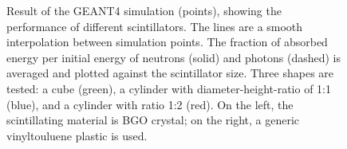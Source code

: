 \begin{figure}
	\centering
	\resizebox{\textwidth}{!}{}
	\caption[Performance of different scintillators from the simulation of a neutron calibration device]%
	{Result of the GEANT4 simulation (points), showing the performance of different scintillators.
	The lines are a smooth interpolation between simulation points.
	The fraction of absorbed energy per initial energy of neutrons (solid) and photons (dashed) %
	is averaged and plotted against the scintillator size.
	Three shapes are tested: a cube (green), a cylinder with diameter-height-ratio of 1:1 (blue), %
	and a cylinder with ratio 1:2 (red).
	On the left, the scintillating material is BGO crystal; on the right, %
	a generic vinyltouluene plastic is used.}
	\label{fig:geant4}
\end{figure}


